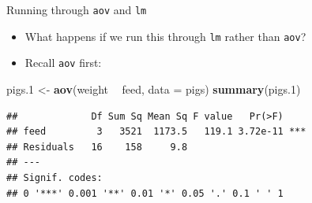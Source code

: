 \documentclass[ignorenonframetext,]{beamer}
\newenvironment{Shaded}{\begin{snugshade}}{\end{snugshade}}
\newcommand{\DataTypeTok}[1]{\textcolor[rgb]{0.13,0.29,0.53}{#1}}
\newcommand{\FloatTok}[1]{\textcolor[rgb]{0.00,0.00,0.81}{#1}}
\newcommand{\KeywordTok}[1]{\textcolor[rgb]{0.13,0.29,0.53}{\textbf{#1}}}
\newcommand{\NormalTok}[1]{#1}
\newcommand{\OperatorTok}[1]{\textcolor[rgb]{0.81,0.36,0.00}{\textbf{#1}}}
\newcommand{\StringTok}[1]{\textcolor[rgb]{0.31,0.60,0.02}{#1}}
\providecommand{\tightlist}{%
  \setlength{\itemsep}{0pt}\setlength{\parskip}{0pt}}
\begin{document}
\begin{frame}[fragile]{Running through \texttt{aov} and \texttt{lm}}
\protect\hypertarget{running-through-aov-and-lm}{}

\begin{itemize}
\tightlist
\item
  What happens if we run this through \texttt{lm} rather than
  \texttt{aov}?
\item
  Recall \texttt{aov} first:
\end{itemize}

\begin{Shaded}
\begin{Highlighting}[]
\NormalTok{pigs}\FloatTok{.1}\NormalTok{ <-}\StringTok{ }\KeywordTok{aov}\NormalTok{(weight }\OperatorTok{~}\StringTok{ }\NormalTok{feed, }\DataTypeTok{data =}\NormalTok{ pigs)}
\KeywordTok{summary}\NormalTok{(pigs}\FloatTok{.1}\NormalTok{)}
\end{Highlighting}
\end{Shaded}

\begin{verbatim}
##             Df Sum Sq Mean Sq F value   Pr(>F)    
## feed         3   3521  1173.5   119.1 3.72e-11 ***
## Residuals   16    158     9.8                     
## ---
## Signif. codes:  
## 0 '***' 0.001 '**' 0.01 '*' 0.05 '.' 0.1 ' ' 1
\end{verbatim}

\end{frame}
\end{document}

